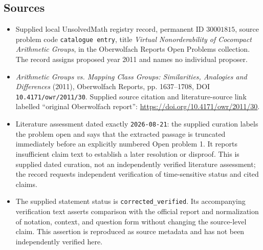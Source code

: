\documentclass[11pt]{article}
\begin{document}
\subsection{Sources}
\begin{itemize}
\item Supplied local UnsolvedMath registry record, permanent ID \(30001815\), source problem code \texttt{catalogue entry}, title \emph{Virtual Nonorderability of Cocompact Arithmetic Groups}, in the Oberwolfach Reports Open Problems collection. The record assigns proposed year 2011 and names no individual proposer.
\item \emph{Arithmetic Groups vs. Mapping Class Groups: Similarities, Analogies and Differences} (2011), Oberwolfach Reports, pp. 1637--1708, DOI \texttt{10.4171/owr/2011/30}. Supplied source citation and literature-source link labelled ``original Oberwolfach report'': \url{https://doi.org/10.4171/owr/2011/30}.
\item Literature assessment dated exactly \texttt{2026-08-21}: the supplied curation labels the problem open and says that the extracted passage is truncated immediately before an explicitly numbered Open problem 1. It reports insufficient claim text to establish a later resolution or disproof. This is supplied dated curation, not an independently verified literature assessment; the record requests independent verification of time-sensitive status and cited claims.
\item The supplied statement status is \texttt{corrected\_verified}. Its accompanying verification text asserts comparison with the official report and normalization of notation, context, and question form without changing the source-level claim. This assertion is reproduced as source metadata and has not been independently verified here.
\end{itemize}
\end{document}
